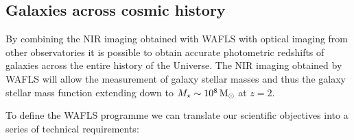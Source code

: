 \documentclass[12pt]{article}
\begin{document}
\subsection*{Galaxies across cosmic history}

By combining the NIR imaging obtained with WAFLS with optical imaging from other observatories it is possible to obtain accurate photometric redshifts of galaxies across the entire history of the Universe. The NIR imaging obtained by WAFLS will allow the measurement of galaxy stellar masses and thus the galaxy stellar mass function extending down to $M_{\star}\sim 10^{8}\,{\rm M_{\odot}}$ at $z=2$. 






%
%
\justifyobservations   %


To define the WAFLS programme we can translate our scientific objectives into a series of technical requirements:
\end{document}
